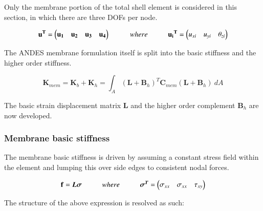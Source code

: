 Only the membrane portion of the total shell element is considered in this section, in which there are three DOFs per node.

\begin{equation} 
\mathbf{u^T} = 
\begin{pmatrix}
\mathbf{u_1} & \mathbf{u_2} & \mathbf{u_3} & \mathbf{u_4}
\end{pmatrix} 
\hspace{10mm}
where
\hspace{10mm}
\mathbf{u{_i}^T} = 
\begin{pmatrix}
{u_{xi}} & {u_{yi}} & {\theta_{zi}}
\end{pmatrix}
\label{equation04}
\end{equation}

The ANDES membrane formulation itself is split into the basic stiffness and the higher order stiffness.

\begin{equation} 
\mathbf{K}_{mem} = \mathbf{K}_{b} + \mathbf{K}_{h} = \int_A (\mathbf{L} + \mathbf{B}_h)^T \mathbf{C}_{mem} (\mathbf{L} + \mathbf{B}_h)\ dA
\label{equationMEM}
\end{equation}

The basic strain displacement matrix $\textbf{L}$ and the higher order complement $\textbf{B}_h$ are now developed. 

\subsubsection{Membrane basic stiffness}

The membrane basic stiffness is driven by assuming a constant stress field within the element and lumping this over side edges to consistent nodal forces. 

\begin{equation} 
\mathbf{f} = \boldsymbol{L\sigma}
\hspace{10mm}
where
\hspace{10mm}
\boldsymbol{\sigma^T} =
\begin{pmatrix}
\sigma_{xx} & \sigma_{xx} & \tau_{xy}
\end{pmatrix}
\label{equation05}
\end{equation}

The structure of the above expression is resolved as such: 

